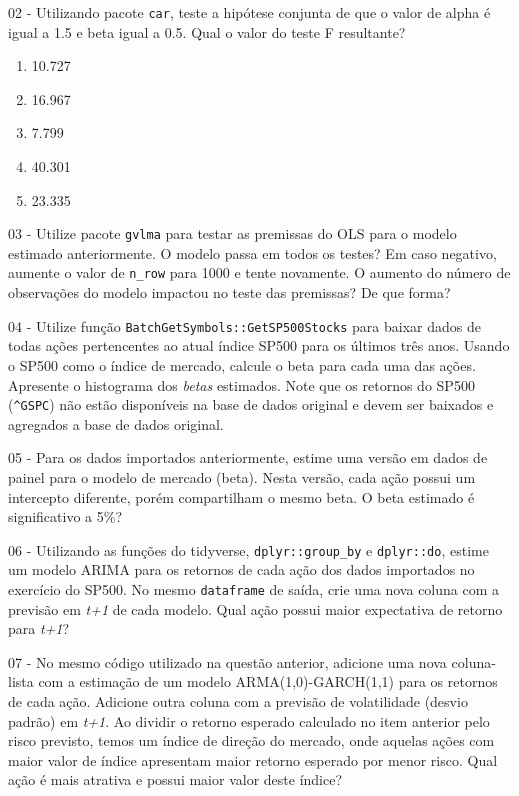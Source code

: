\documentclass[
  11pt,
]{book}
\providecommand{\tightlist}{%
  \setlength{\itemsep}{0pt}\setlength{\parskip}{0pt}}
\begin{document}
02 -
Utilizando pacote \texttt{car}, teste a hipótese conjunta de que o valor de alpha é igual a 1.5 e beta igual a 0.5. Qual o valor do teste F resultante?

\begin{enumerate}
\def\labelenumi{\alph{enumi})}
\tightlist
\item
  10.727
\item
  16.967
\item
  7.799
\item
  40.301
\item
  23.335
\end{enumerate}

03 -
Utilize pacote \texttt{gvlma} para testar as premissas do OLS para o modelo estimado anteriormente. O modelo passa em todos os testes? Em caso negativo, aumente o valor de \texttt{n\_row} para 1000 e tente novamente. O aumento do número de observações do modelo impactou no teste das premissas? De que forma?

04 -
Utilize função \texttt{BatchGetSymbols::GetSP500Stocks} para baixar dados de todas ações pertencentes ao atual índice SP500 para os últimos três anos. Usando o SP500 como o índice de mercado, calcule o beta para cada uma das ações. Apresente o histograma dos \emph{betas} estimados. Note que os retornos do SP500 (\texttt{\textquotesingle{}\^{}GSPC\textquotesingle{}}) não estão disponíveis na base de dados original e devem ser baixados e agregados a base de dados original.

05 -
Para os dados importados anteriormente, estime uma versão em dados de painel para o modelo de mercado (beta). Nesta versão, cada ação possui um intercepto diferente, porém compartilham o mesmo beta. O beta estimado é significativo a 5\%?

06 -
Utilizando as funções do tidyverse, \texttt{dplyr::group\_by} e \texttt{dplyr::do}, estime um modelo ARIMA para os retornos de cada ação dos dados importados no exercício do SP500. No mesmo \texttt{dataframe} de saída, crie uma nova coluna com a previsão em \emph{t+1} de cada modelo. Qual ação possui maior expectativa de retorno para \emph{t+1}?

07 -
No mesmo código utilizado na questão anterior, adicione uma nova coluna-lista com a estimação de um modelo ARMA(1,0)-GARCH(1,1) para os retornos de cada ação. Adicione outra coluna com a previsão de volatilidade (desvio padrão) em \emph{t+1}. Ao dividir o retorno esperado calculado no item anterior pelo risco previsto, temos um índice de direção do mercado, onde aquelas ações com maior valor de índice apresentam maior retorno esperado por menor risco. Qual ação é mais atrativa e possui maior valor deste índice?
\end{document}
